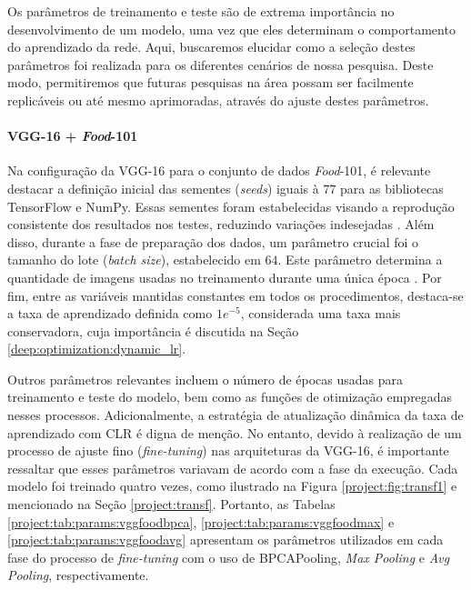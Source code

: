 Os parâmetros de treinamento e teste são de extrema importância no desenvolvimento de um modelo, uma vez que eles determinam o comportamento do aprendizado da rede. Aqui, buscaremos elucidar como a seleção destes parâmetros foi realizada para os diferentes cenários de nossa pesquisa. Deste modo, permitiremos que futuras pesquisas na área possam ser facilmente replicáveis ou até mesmo aprimoradas, através do ajuste destes parâmetros.

\paragraph{VGG-16 + \textit{Food}-101}
\label{params:vggfood}
Na configuração da VGG-16 para o conjunto de dados \textit{Food}-101, é relevante destacar a definição inicial das sementes (\textit{seeds}) iguais à $77$ para as bibliotecas TensorFlow e NumPy. Essas sementes foram estabelecidas visando a reprodução consistente dos resultados nos testes, reduzindo variações indesejadas \citep{Alahmari2020ChallengesModels}. Além disso, durante a fase de preparação dos dados, um parâmetro crucial foi o tamanho do lote (\textit{batch size}), estabelecido em $64$. Este parâmetro determina a quantidade de imagens usadas no treinamento durante uma única época \citep{Kandel2020TheDataset}. Por fim, entre as variáveis mantidas constantes em todos os procedimentos, destaca-se a taxa de aprendizado definida como $1e^{-5}$, considerada uma taxa mais conservadora, cuja importância é discutida na Seção \ref{deep:optimization:dynamic_lr}.

Outros parâmetros relevantes incluem o número de épocas usadas para treinamento e teste do modelo, bem como as funções de otimização empregadas nesses processos. Adicionalmente, a estratégia de atualização dinâmica da taxa de aprendizado com CLR \citep{Smith2017CyclicalNetworks} é digna de menção. No entanto, devido à realização de um processo de ajuste fino (\textit{fine-tuning}) nas arquiteturas da VGG-16, é importante ressaltar que esses parâmetros variavam de acordo com a fase da execução. Cada modelo foi treinado quatro vezes, como ilustrado na Figura \ref{project:fig:transf1} e mencionado na Seção \ref{project:transf}. Portanto, as Tabelas \ref{project:tab:params:vggfoodbpca}, \ref{project:tab:params:vggfoodmax} e \ref{project:tab:params:vggfoodavg} apresentam os parâmetros utilizados em cada fase do processo de \textit{fine-tuning} com o uso de BPCAPooling, \textit{Max Pooling} e \textit{Avg Pooling}, respectivamente.

